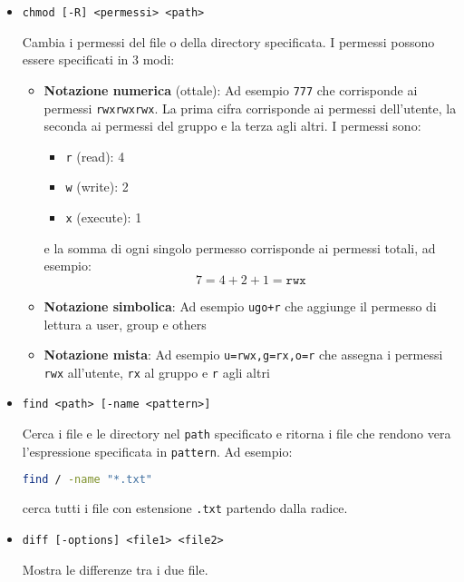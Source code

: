 \documentclass[a4paper]{article}
\begin{document}
\begin{itemize}
\item
\begin{lstlisting}
chmod [-R] <permessi> <path>
\end{lstlisting}
Cambia i permessi del file o della directory specificata. I permessi possono essere
specificati in 3 modi:
\begin{itemize}
  \item \textbf{Notazione numerica} (ottale): Ad esempio \texttt{777} che corrisponde ai
    permessi \texttt{rwxrwxrwx}.
    La prima cifra corrisponde ai permessi dell'utente, la seconda
    ai permessi del gruppo e la terza agli altri. I permessi sono:
    \begin{itemize}
      \item \texttt{r} (read): 4
      \item \texttt{w} (write): 2
      \item \texttt{x} (execute): 1
    \end{itemize}
    e la somma di ogni singolo permesso corrisponde ai permessi totali, ad esempio:
    \[
      7 = 4 + 2 + 1 = \texttt{rwx}
    \] 
  \item \textbf{Notazione simbolica}: Ad esempio \texttt{ugo+r} che aggiunge il permesso
    di lettura a user, group e others
  \item \textbf{Notazione mista}: Ad esempio \texttt{u=rwx,g=rx,o=r} che assegna i permessi
    \texttt{rwx} all'utente, \texttt{rx} al gruppo e \texttt{r} agli altri
\end{itemize}

\item
\begin{lstlisting}
find <path> [-name <pattern>]
\end{lstlisting}
Cerca i file e le directory nel \texttt{path} specificato e ritorna i file che rendono
vera l'espressione specificata in \texttt{pattern}. Ad esempio:
\begin{lstlisting}[language=bash]
find / -name "*.txt"
\end{lstlisting}
cerca tutti i file con estensione \texttt{.txt} partendo dalla radice.

\item
\begin{lstlisting}
diff [-options] <file1> <file2>
\end{lstlisting}
Mostra le differenze tra i due file.
\end{itemize}
\end{document}
